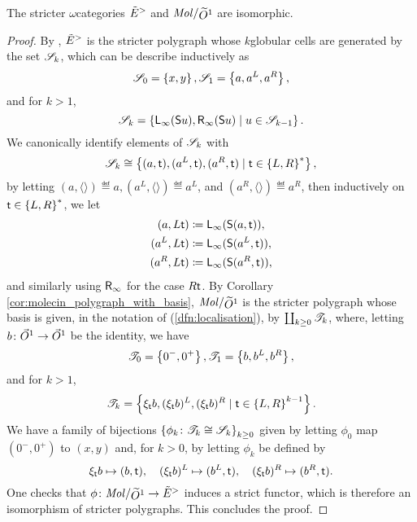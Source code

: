 \begin{lem} \label{lem:swE_is_iso_to_molecin_loc_globe}
    The stricter \( \omega \)\nbd categories \( \tilde E^> \) and \( \molecin{\rglobe{1}} \) are isomorphic.
\end{lem}
\begin{proof}
    By \cite[Remark 1.29]{hadzihasanovic2024model}, \( \tilde E^> \) is the stricter polygraph whose \( k \)\nbd globular cells are
    generated by the set \( \mathscr{S}_k \), which can be describe inductively as
    \begin{equation*}
        \mathscr{S}_0 = \left\{ {x, y} \right\}, \mathscr{S}_1 = \left\{ {a, a^L, a^R} \right\},
    \end{equation*} 
    and for \( k > 1 \),
    \begin{equation*}
        \mathscr{S}_k = \left\{ {\mathsf{L}_\infty(\mathsf{S}{u}), \mathsf{R}_\infty(\mathsf{S}{u}) \mid u \in \mathscr{S}_{k - 1}} \right\}.
    \end{equation*}
    We canonically identify elements of \( \mathscr{S}_k \) with
    \begin{equation*}
        \mathscr{S}_k \cong \left\{ {(a, \mathsf{t}), (a^L, \mathsf{t}), (a^R, \mathsf{t}) \mid \mathsf{t} \in \left\{ {L, R} \right\}^*} \right\},
    \end{equation*}
    by letting \( (a, \langle\rangle) \eqdef a, (a^L, \langle\rangle) \eqdef a^L \), and \( (a^R, \langle\rangle) \eqdef a^R \), then inductively on \( \mathsf{t} \in \left\{ {L, R} \right\}^* \), we let 
    \begin{align*}
        (a, L\mathsf{t})   & \coloneqq \mathsf{L}_\infty(\mathsf{S}{(a, \mathsf{t})}),  \\
        (a^L, L\mathsf{t}) & \coloneqq \mathsf{L}_\infty(\mathsf{S}{(a^L, \mathsf{t})}), \\
        (a^R, L\mathsf{t}) & \coloneqq \mathsf{L}_\infty(\mathsf{S}{(a^R, \mathsf{t})}),
    \end{align*}
    and similarly using \( \mathsf{R}_\infty \) for the case \( R\mathsf{t} \).    
    By Corollary \ref{cor:molecin_polygraph_with_basis}, \( \molecin{\rglobe{1}} \) is the stricter polygraph whose basis is given, in the notation of (\ref{dfn:localisation}), by \( \coprod_{k \geq 0} \mathscr{T}_k \), where, letting \( b \colon \vec{O}^{1} \to \vec{O}^{1} \) be the identity, we have
    \begin{equation*}
        \mathscr{T}_0 = \left\{ {0^-, 0^+} \right\}, \mathscr{T}_1 = \left\{ {b, b^L, b^R} \right\},
    \end{equation*}
    and for \( k > 1 \),
    \begin{equation*}
        \mathscr{T}_k = \left\{ {\xi_{\mathsf{t}}b, (\xi_{\mathsf{t}}b)^L, (\xi_{\mathsf{t}}b)^R \mid \mathsf{t} \in \left\{ {L, R} \right\}^{k - 1}} \right\}.
    \end{equation*}
    We have a family of bijections \( \left\{ {\phi_k \colon \mathscr{T}_k \cong \mathscr{S}_k} \right\}_{k \geq 0} \) given by letting \( \phi_0 \) map \( (0^-, 0^+) \) to \( (x, y) \) and, for \( k > 0 \), by letting \( \phi_k \) be defined by
    \begin{equation*}
        \xi_{\mathsf{t}}b \mapsto (b, \mathsf{t}),\quad (\xi_{\mathsf{t}}b)^L \mapsto (b^L, \mathsf{t}),\quad (\xi_{\mathsf{t}}b)^R \mapsto (b^R, \mathsf{t}).
    \end{equation*}
    One checks that \( \phi \colon \molecin{\rglobe{1}} \to \swE \) induces a strict functor, which is therefore an isomorphism of stricter polygraphs.
    This concludes the proof.
\end{proof}

